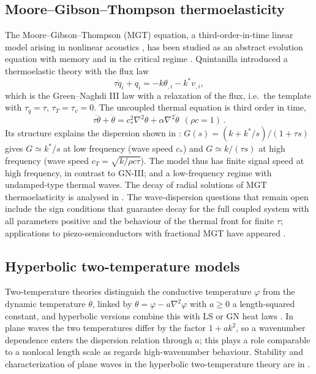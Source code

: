 \subsection{Moore--Gibson--Thompson thermoelasticity}\label{sec:mgt}
The Moore--Gibson--Thompson (MGT) equation, a third-order-in-time linear model arising in nonlinear acoustics \citep{MooreGibson1960}, has been studied as an abstract evolution equation with memory and in the critical regime \citep{MarchandMcDevittTriggiani2012,LasieckaWang2015MGT,DellOroLasieckaPata2016MGT,DellOroPata2016Viscoelasticity}. Quintanilla \citep{Quintanilla2019} introduced a thermoelastic theory with the flux law
\begin{equation}
\tau\dot q_i+q_i=-k\theta_{,i}-k^*v_{,i},
\end{equation}
which is the Green--Naghdi III law with a relaxation of the flux, i.e.\ the template with $\tau_q=\tau$, $\tau_T=\tau_v=0$. The uncoupled thermal equation is third order in time,
\begin{equation}
\tau\dddot\theta+\ddot\theta=c_*^2\nabla^2\theta+\alpha\nabla^2\dot\theta\ \ (\rho c=1)\,.
\end{equation}
Its structure explains the dispersion shown in : $G(s)=(k+k^*/s)/(1+\tau s)$ gives $G\simeq k^*/s$ at low frequency (wave speed $c_*$) and $G\simeq k/(\tau s)$ at high frequency (wave speed $c_T=\sqrt{k/\rho c\tau}$). The model thus has finite signal speed at high frequency, in contrast to GN-III; and a low-frequency regime with undamped-type thermal waves. The decay of radial solutions of MGT thermoelasticity is analysed in \citep{Bazarra2021MGTradial}. The wave-dispersion questions that remain open include the sign conditions that guarantee decay for the full coupled system with all parameters positive and the behaviour of the thermal front for finite $\tau$; applications to piezo-semiconductors with fractional MGT have appeared \citep{Gupta2024,Aldandani2026}.

\subsection{Hyperbolic two-temperature models}
Two-temperature theories \citep{ChenGurtin1968,Youssef2006} distinguish the conductive temperature $\varphi$ from the dynamic temperature $\theta$, linked by $\theta=\varphi-a\nabla^2\varphi$ with $a\ge0$ a length-squared constant, and hyperbolic versions combine this with LS or GN heat laws \citep{Prasad2020,Alzahrani2020,Bassiouny2020}. In plane waves the two temperatures differ by the factor $1+ak^2$, so a wavenumber dependence enters the dispersion relation through $a$; this plays a role comparable to a nonlocal length scale as regards high-wavenumber behaviour. Stability and characterization of plane waves in the hyperbolic two-temperature theory are in \citep{Prasad2020}.

